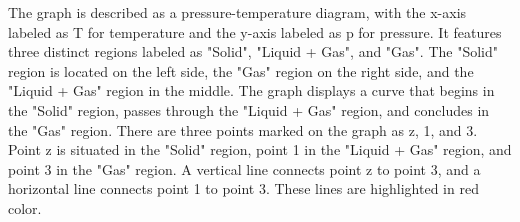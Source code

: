 The graph is described as a pressure-temperature diagram, with the x-axis labeled as T for temperature and the y-axis labeled as p for pressure. It features three distinct regions labeled as "Solid", "Liquid + Gas", and "Gas". The "Solid" region is located on the left side, the "Gas" region on the right side, and the "Liquid + Gas" region in the middle. The graph displays a curve that begins in the "Solid" region, passes through the "Liquid + Gas" region, and concludes in the "Gas" region. There are three points marked on the graph as z, 1, and 3. Point z is situated in the "Solid" region, point 1 in the "Liquid + Gas" region, and point 3 in the "Gas" region. A vertical line connects point z to point 3, and a horizontal line connects point 1 to point 3. These lines are highlighted in red color.